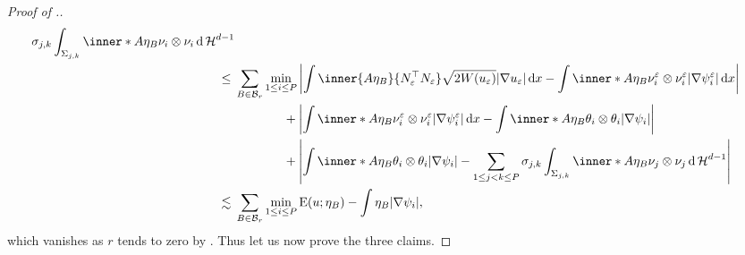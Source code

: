 \begin{proof}[Proof of .]
\begin{align*}
{				\sigma_{ j , k }
				\int_{ \Sigma_{ j , k } }
					\inner*{ A \eta_{ B } }
					{ \nu_{ i } \otimes \nu_{i } }
				\dd{ \hm^{ d - 1 } }
		}
		\\
		\leq{} &
		\sum_{ B \in \mathcal{ B }_{ r } }
			\min_{ 1 \leq i \leq P }
				\abs{ 
					\int
						\inner{ A \eta_{ B } }{ N_{ \varepsilon }^{ \top } N_{ \varepsilon } }
						\sqrt{ 2 W ( u_{ \varepsilon } ) }
						\abs{ \nabla u_{ \varepsilon } }
					\dd{ x }
					-
					\int
						\inner*{ A \eta_{ B } }
						{ \nu_{ i }^{ \varepsilon } \otimes \nu_{ i }^{ 
						\varepsilon } }
						\abs{ \nabla \psi_{ i }^{ \varepsilon } }
					\dd{ x }
				}
			\\
			& \quad \quad \quad \;\;\;\!\:+
			\abs{ 
				\int
					\inner*{ A \eta_{ B } }{ \nu_{ i }^{ \varepsilon } \otimes \nu_{ i }^{ \varepsilon } }
					\abs{ \nabla \psi_{ i }^{ \varepsilon } }
				\dd{ x }
				-
				\int
					\inner*{ A \eta_{ B } }
					{ \theta_{ i } \otimes \theta_{ i } }
				\abs{ \nabla \psi_{ i } }
			}
			\\
			& \quad \quad \quad \;\;\;\!\: +
			\abs{ 
				\int
					\inner*{ A \eta_{ B } }
					{ \theta_{ i } \otimes \theta_{ i } }
				\abs{ \nabla \psi_{ i } }
				-
				\sum_{ 1 \leq j < k \leq P }
					\sigma_{ j , k }
					\int_{ \Sigma_{ j , k } }
						\inner*{ A \eta_{ B } }
						{ \nu_{ j } \otimes \nu_{ j } }
					\dd{ \hm^{ d - 1 } }
			}
		\\
		\lesssim {} &
			\sum_{ B \in \mathcal{ B }_{ r } }
				\min_{ 1 \leq i \leq P }
					\energy ( u ; \eta_{ B } )
					-
					\int
						\eta_{ B }
					\abs{ \nabla \psi_{ i } },
	\end{align*}
	which vanishes as $ r $ tends to zero by 
	.
	Thus let us now prove the three claims.
	

\end{proof}
